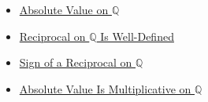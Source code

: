 \begin{dependencies}
\begin{itemize}
  \item \hyperref[def:absolute-value-on-q]{Absolute Value on $\mathbb{Q}$}
  \item \hyperref[thm:reciprocal-on-q-well-defined]{Reciprocal on $\mathbb{Q}$ Is Well-Defined}
  \item \hyperref[thm:sign-of-reciprocal-q]{Sign of a Reciprocal on $\mathbb{Q}$}
  \item \hyperref[thm:absolute-value-multiplicative-on-q]{Absolute Value Is Multiplicative on $\mathbb{Q}$}
\end{itemize}
\end{dependencies}
